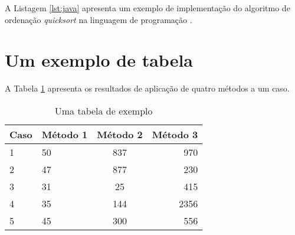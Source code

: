 A Listagem \ref{lst:java} apresenta um exemplo de implementação do algoritmo de ordenação \textit{quicksort} na linguagem de programação \Java{}.






\pagebreak %
\section{Um exemplo de tabela}

A Tabela \ref{tab:caso} apresenta os resultados de aplicação de quatro métodos a um caso.

\begin{table}[htb]
\caption{Uma tabela de exemplo} %
\centering %
\begin{tabular}{l l c r} %
\hline\hline %
Caso & Método 1 & Método 2 & Método 3 \\ [0.5ex] %
\hline %
1 & 50 & 837 & 970 \\ %
2 & 47 & 877 & 230 \\
3 & 31 & 25 & 415 \\
4 & 35 & 144 & 2356 \\
5 & 45 & 300 & 556 \\ [1ex] %
\hline %
\end{tabular}
\label{tab:caso} %
\end{table}